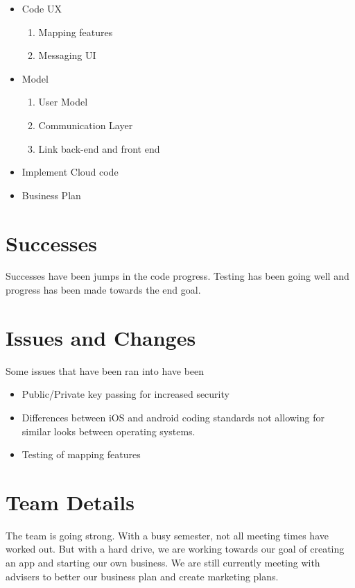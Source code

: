 \documentclass[11pt]{article}
\begin{document}
	\begin{itemize}
	\item Code UX
		\begin{enumerate}
		\item Mapping features
		\item Messaging UI
		\end{enumerate}
	\item Model
		\begin{enumerate}
		\item User Model
		\item Communication Layer
		\item Link back-end and front end
		\end{enumerate}
	\item Implement Cloud code
	\item Business Plan

	\end{itemize}

\section*{Successes}
Successes have been jumps in the code progress. Testing has been going well and progress has been made towards the end goal. 


\section*{Issues and Changes}
Some issues that have been ran into have been

	\begin{itemize}
	\item Public/Private key passing for increased security
	\item Differences between iOS and android coding standards not allowing for similar looks between operating systems.
	\item Testing of mapping features 
	\end{itemize}




	
\section*{Team Details}
The team is going strong. With a busy semester, not all meeting times have worked out. But with a hard drive, we are working towards our goal of creating an app and starting our own business. We are still currently meeting with advisers to better our business plan and create marketing plans.
\end{document}
